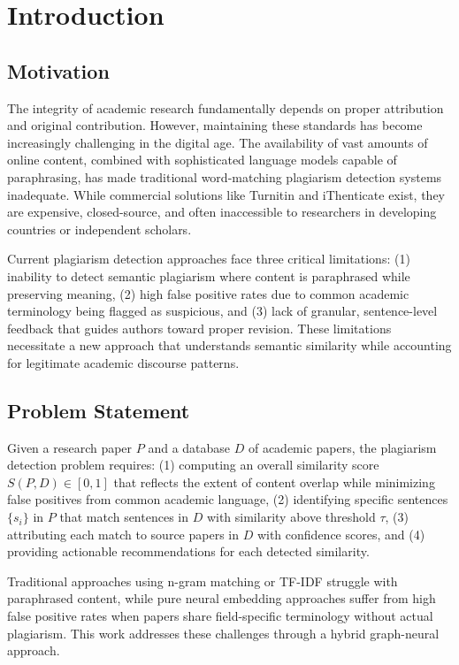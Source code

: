 \documentclass[conference]{IEEEtran}
\begin{document}
\section{Introduction}

\subsection{Motivation}
The integrity of academic research fundamentally depends on proper attribution and original contribution. However, maintaining these standards has become increasingly challenging in the digital age. The availability of vast amounts of online content, combined with sophisticated language models capable of paraphrasing, has made traditional word-matching plagiarism detection systems inadequate. While commercial solutions like Turnitin and iThenticate exist, they are expensive, closed-source, and often inaccessible to researchers in developing countries or independent scholars.

Current plagiarism detection approaches face three critical limitations: (1) inability to detect semantic plagiarism where content is paraphrased while preserving meaning, (2) high false positive rates due to common academic terminology being flagged as suspicious, and (3) lack of granular, sentence-level feedback that guides authors toward proper revision. These limitations necessitate a new approach that understands semantic similarity while accounting for legitimate academic discourse patterns.

\subsection{Problem Statement}
Given a research paper $P$ and a database $D$ of academic papers, the plagiarism detection problem requires: (1) computing an overall similarity score $S(P, D) \in [0, 1]$ that reflects the extent of content overlap while minimizing false positives from common academic language, (2) identifying specific sentences $\{s_i\}$ in $P$ that match sentences in $D$ with similarity above threshold $\tau$, (3) attributing each match to source papers in $D$ with confidence scores, and (4) providing actionable recommendations for each detected similarity.

Traditional approaches using n-gram matching or TF-IDF struggle with paraphrased content, while pure neural embedding approaches suffer from high false positive rates when papers share field-specific terminology without actual plagiarism. This work addresses these challenges through a hybrid graph-neural approach.
\end{document}
